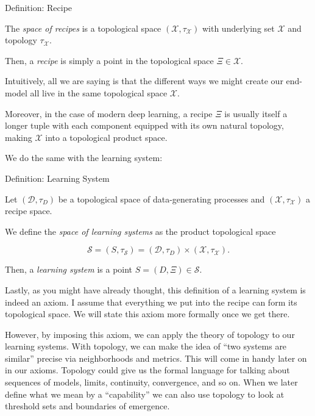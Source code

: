 \documentclass[12pt]{article}
\begin{document}
\begin{statementbox}{Definition: Recipe}

The \textit{space of recipes} is a topological space $(\mathcal X , \tau_{\mathcal X})$ with underlying set $\mathcal X$ and topology $\tau _\mathcal X$.

Then, a \textit{recipe} is simply a point in the topological space $\Xi\in \mathcal X$.

\end{statementbox}

Intuitively, all we are saying is that the different ways we might create our end-model all live in the same topological space $\mathcal X$. 

Moreover, in the case of modern deep learning, a recipe $\Xi$ is usually itself a longer tuple with each component equipped with its own natural topology, making $\mathcal X$ into a topological product space. 

We do the same with the learning system:

\begin{statementbox}{Definition: Learning System}

Let $(\mathcal D, \tau_D)$ be a topological space of data-generating processes and $(\mathcal X, \tau_\mathcal X)$ a recipe space.

We define the \textit{space of learning systems} as the product topological space

\[
\mathcal S=(S,\tau_\mathcal S)=(\mathcal D , \tau_D)\times (\mathcal X, \tau_\mathcal X).
\]

Then, a \textit{learning system} is a point $S=(D,\Xi)\in \mathcal S$.

\end{statementbox}

Lastly, as you might have already thought, this definition of a learning system is indeed an axiom. I assume that everything we put into the recipe can form its topological space. We will state this axiom more formally once we get there.

However, by imposing this axiom, we can apply the theory of topology to our learning systems. With topology, we can make the idea of “two systems are similar” precise via neighborhoods and metrics. This will come in handy later on in our axioms. Topology could give us the formal language for talking about sequences of models, limits, continuity, convergence, and so on. When we later define what we mean by a “capability” we can also use topology to look at threshold sets and boundaries of emergence.
\end{document}
